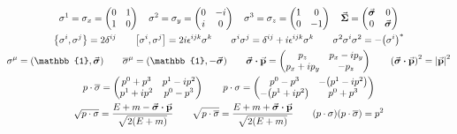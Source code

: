 \begin{gather*}
        \sigma^1 = \sigma_x = \begin{pmatrix}
                0 &1\\
                1 &0
        \end{pmatrix}
        \quad
        \sigma^2 = \sigma_y = \begin{pmatrix}
                0 &-i\\
                i &0
        \end{pmatrix}
        \quad
        \sigma^3 = \sigma_z = \begin{pmatrix}
                1 &0\\
                0 &-1
        \end{pmatrix}
        \quad
        \va*{\Sigma} = \begin{pmatrix}
                \va*{\sigma} &0\\
                0 &\va*{\sigma}\\
        \end{pmatrix}
        \\
        \acomm{\sigma^i}{\sigma^j} = 2\delta^{ij}
        \qquad
        \comm{\sigma^i}{\sigma^j} = 2i\epsilon^{ijk}\sigma^k
        \qquad
        \sigma^i\sigma^j = \delta^{ij} + i\epsilon^{ijk}\sigma^k
        \qquad
        \sigma^2\sigma^i\sigma^2 = -\qty(\sigma^i)^*
        \\
        \sigma^\mu=\qty(\mathbb{1},\va*{\sigma})
        \qquad
        \overline{\sigma}^\mu=\qty(\mathbb{1},-\va*{\sigma})
        \qquad
        \va*{\sigma}\vdot\va{p} = \begin{pmatrix}
                p_z      &p_x-ip_y \\
                p_x+ip_y &-p_z     \\
        \end{pmatrix}
        \qquad
        \qty(\va*{\sigma}\vdot\va{p})^2 = \abs{\va{p}}^2
        \\
        p\cdot\overline{\sigma} = \begin{pmatrix}
                p^0+p^3  &p^1-ip^2 \\
                p^1+ip^2 &p^0-p^3  \\
        \end{pmatrix}
        \qquad
        p\cdot\sigma = \begin{pmatrix}
                p^0 - p^3       &-\qty(p^1-ip^2) \\
                -\qty(p^1+ip^2) &p^0+p^3         \\
        \end{pmatrix}
        \\
        \sqrt{p\cdot\sigma} = \frac{E + m - \va*{\sigma}\vdot\va{p}}{\sqrt{2(E+m)}}
        \qquad
        \sqrt{p\cdot\overline{\sigma}} = \frac{E + m + \va*{\sigma}\vdot\va{p}}{\sqrt{2(E+m)}}
        \qquad
        \qty(p\cdot\sigma)\qty(p\cdot\overline{\sigma}) = p^2
\end{gather*}
